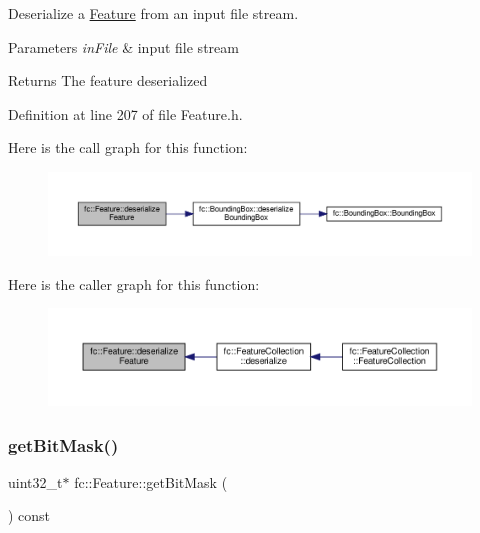 Deserialize a \hyperlink{classfc_1_1Feature}{Feature} from an input file stream. 


\begin{DoxyParams}{Parameters}
{\em in\+File} & input file stream \\
\hline
\end{DoxyParams}
\begin{DoxyReturn}{Returns}
The feature deserialized 
\end{DoxyReturn}


Definition at line 207 of file Feature.\+h.

Here is the call graph for this function\+:
\nopagebreak
\begin{figure}[H]
\begin{center}
\leavevmode
\includegraphics[width=350pt]{d7/d71/classfc_1_1Feature_a6ea5b6e3e6d14f29a6faa9b4464f8d4b_cgraph}
\end{center}
\end{figure}
Here is the caller graph for this function\+:
\nopagebreak
\begin{figure}[H]
\begin{center}
\leavevmode
\includegraphics[width=350pt]{d7/d71/classfc_1_1Feature_a6ea5b6e3e6d14f29a6faa9b4464f8d4b_icgraph}
\end{center}
\end{figure}
\mbox{\label{classfc_1_1Feature_a965a679e9a751be23d2a7d51c0573a61}} 
\subsubsection{\texorpdfstring{get\+Bit\+Mask()}{getBitMask()}}
{\footnotesize\ttfamily uint32\+\_\+t$\ast$ fc\+::\+Feature\+::get\+Bit\+Mask (\begin{DoxyParamCaption}{ }\end{DoxyParamCaption}) const\hspace{0.3cm}{\ttfamily [inline]}}



